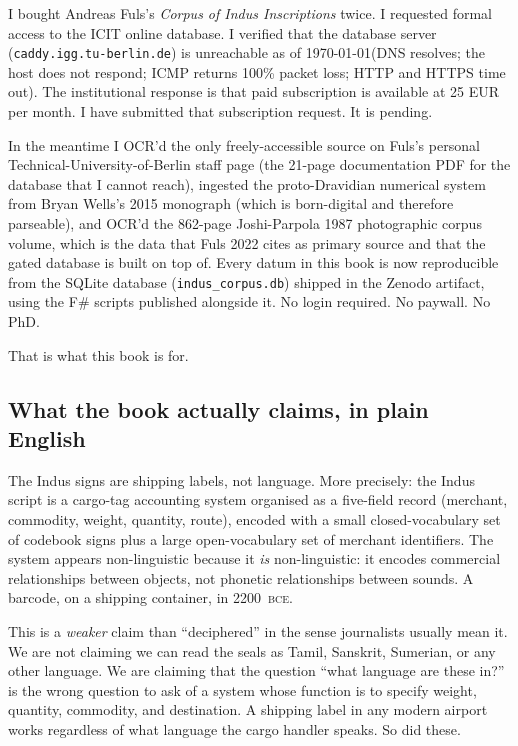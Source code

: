 I bought Andreas Fuls's \textit{Corpus of Indus Inscriptions}
twice. I requested formal access to the ICIT online database. I
verified that the database server (\texttt{caddy.igg.tu-berlin.de})
is unreachable as of \today (DNS resolves; the host does not
respond; ICMP returns 100\% packet loss; HTTP and HTTPS time out).
The institutional response is that paid subscription is available
at 25 EUR per month. I have submitted that subscription request.
It is pending.

In the meantime I OCR'd the only freely-accessible source on
Fuls's personal Technical-University-of-Berlin staff page (the
21-page documentation PDF for the database that I cannot reach),
ingested the proto-Dravidian numerical system from Bryan Wells's
2015 monograph (which is born-digital and therefore parseable),
and OCR'd the 862-page Joshi-Parpola 1987 photographic corpus
volume, which is the data that Fuls 2022 cites as primary source
and that the gated database is built on top of. Every datum in
this book is now reproducible from the SQLite database
(\texttt{indus\_corpus.db}) shipped in the Zenodo artifact, using
the F\# scripts published alongside it. No login required. No
paywall. No PhD.

That is what this book is for.

\subsection{What the book actually claims, in plain English}

The Indus signs are shipping labels, not language. More precisely:
the Indus script is a cargo-tag accounting system organised as a
five-field record (merchant, commodity, weight, quantity, route),
encoded with a small closed-vocabulary set of codebook signs plus
a large open-vocabulary set of merchant identifiers. The system
appears non-linguistic because it \emph{is} non-linguistic: it
encodes commercial relationships between objects, not phonetic
relationships between sounds. A barcode, on a shipping container,
in 2200~\textsc{bce}.

This is a \emph{weaker} claim than ``deciphered'' in the sense
journalists usually mean it. We are not claiming we can read the
seals as Tamil, Sanskrit, Sumerian, or any other language. We are
claiming that the question ``what language are these in?'' is the
wrong question to ask of a system whose function is to specify
weight, quantity, commodity, and destination. A shipping label
in any modern airport works regardless of what language the cargo
handler speaks. So did these.

